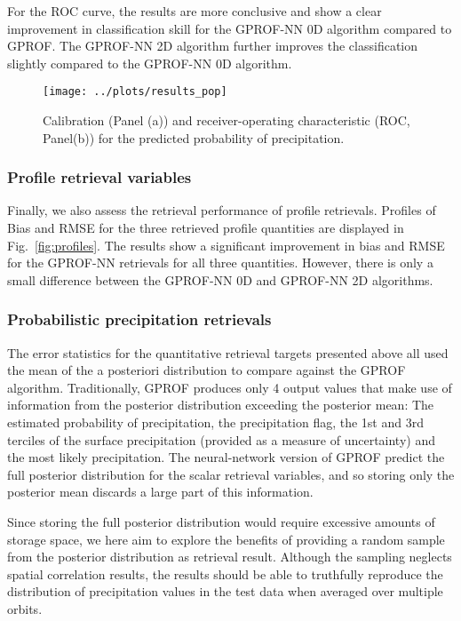 \documentclass[a4paper,11pt,bibtotoc]{scrartcl}
\begin{document}
For the ROC curve, the results are more conclusive and show a clear improvement in classification
skill for the GPROF-NN 0D algorithm compared to GPROF. The GPROF-NN 2D algorithm further improves
the classification slightly compared to the GPROF-NN 0D algorithm.


\begin{figure}[hbpt]
  \centering
  \texttt{[image: ../plots/results\_pop]}
  \caption{
    Calibration (Panel (a)) and receiver-operating characteristic (ROC, Panel(b)) for
    the predicted probability of precipitation.
  }
  \label{fig:roc}
\end{figure}

\subsubsection{Profile retrieval variables}

Finally, we also assess the retrieval performance of profile retrievals.
Profiles of Bias and RMSE for the three retrieved profile quantities are
displayed in Fig.~\ref{fig:profiles}. The results show a significant improvement
in bias and RMSE for the GPROF-NN retrievals for all three quantities.
However, there is only a small difference between the GPROF-NN 0D and
GPROF-NN 2D algorithms.


\subsubsection{Probabilistic precipitation retrievals}

The error statistics for the quantitative retrieval targets presented above all
used the mean of the a posteriori distribution to compare against the GPROF
algorithm. Traditionally, GPROF produces only 4 output values that make use of
information from the posterior distribution exceeding the posterior mean: The
estimated probability of precipitation, the precipitation flag, the 1st and 3rd
terciles of the surface precipitation (provided as a measure of uncertainty) and
the most likely precipitation. The neural-network version of GPROF predict the
full posterior distribution for the scalar retrieval variables, and so storing
only the posterior mean discards a large part of this information.

Since storing the full posterior distribution would require excessive amounts
of storage space, we here aim to explore the benefits of providing a random
sample from the posterior distribution as retrieval result. Although the
sampling neglects spatial correlation results, the results should be
able to truthfully reproduce the distribution of precipitation values in the
test data when averaged over multiple orbits.
\end{document}
